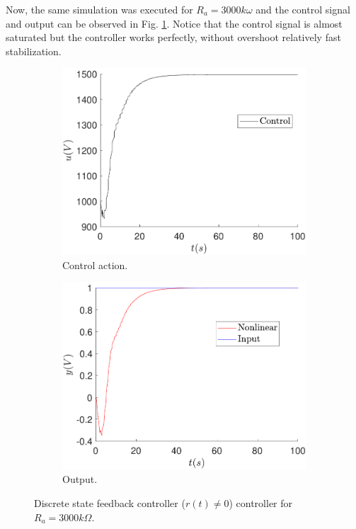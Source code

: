     Now, the same simulation was executed for $R_a=3000k\omega$ and the control signal and output can be observed in Fig. \ref{fig:sens_ra_3000_state_noess}. Notice that the control signal is almost saturated but the controller works perfectly, without overshoot relatively fast stabilization.
    \begin{figure}
        \centering
        \begin{subfigure}[b]{0.475\textwidth}
            \centering
            \includegraphics[scale=0.425]{files/sens_analysis/Ref!0/control_analysis_sfc_a_3000_ref_dif_0.pdf}
            \caption{Control action.}
        \end{subfigure}
        \vskip0.1cm
        \begin{subfigure}[b]{0.475\textwidth}   
            \centering 
            \includegraphics[scale=0.425]{files/sens_analysis/Ref!0/analysis_sfc_a_3000_ref_dif_0.pdf}
            \caption{Output.}
        \end{subfigure}
        \caption{Discrete state feedback controller ($r(t)\neq0$) controller for $R_a=3000k\Omega$.}
        \label{fig:sens_ra_3000_state_noess}
	\end{figure}
	

